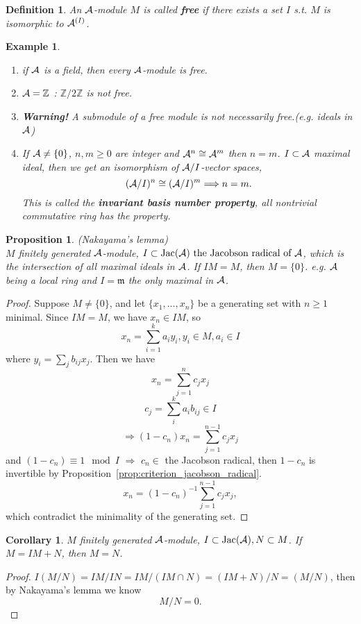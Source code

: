 \documentclass[11pt]{article}
\newtheorem{prop}[thm]{Proposition}
\newtheorem{cor}[thm]{Corollary}
\newtheorem{dfn}[thm]{Definition}
\newtheorem{ex}[thm]{Example}
\newcommand{\intg}{\mathbb Z}
\newcommand{\scm}{{\mathfrak m}}
\newcommand{\cala}{{\cal A}}
\newcommand{\Lrta}{\Longrightarrow}
\begin{document}
\begin{dfn}
An $\cala$-module $M$ is called \textbf{free} if there exists a set $I$ s.t. $M$ is isomorphic to $\cala^{(I)}$.
\end{dfn}
\begin{ex}\ 
\begin{enumerate}
\item if $\cala$ is a field, then every $\cala$-module is free.
\item $\cala=\intg$ : $\intg/2\intg$ is not free.
\item \textbf{Warning!} A submodule of a free module is not necessarily free.(e.g. ideals in $\cala$)
\item If $\cala\neq \{0\}$, $n,m\geq 0$ are integer and $\cala^n\cong \cala^m$ then $n=m$.
$I\subset \cala$ maximal ideal, then we get an isomorphism of $\cala/I$-vector spaces,
$$
(\cala/I)^n\cong(\cala/I)^m\Lrta n=m.
$$
This is called the \textbf{invariant basis number property}, all nontrivial commutative ring has the property. 
\end{enumerate}
\end{ex}

\begin{prop}\label{lem:Nakayama}
(Nakayama's lemma)\\
$M$ finitely generated $\cala$-module, $I\subset \text{Jac}(\cala) \text{  the Jacobson radical of $\cala$}$, which is the intersection of all maximal ideals in $\cala$.
If $IM=M$, then $M=\{0\}$. e.g. 
$\cala$ being a local ring and $I=\scm$ the only maximal in $\cala$.
\end{prop}

\begin{proof}
Suppose $M\neq \{0\}$, and let $\{x_1,...,x_n\}$ be a generating set with $n\geq1$ minimal.
Since $IM=M$, we have $x_n\in IM$, so
$$
x_n=\sum_{i=1}^k
a_i y_i, y_i\in M, a_i\in I
$$
where $y_i=\sum_j b_{ij }x_j$.
Then we have 
$$
x_n=\sum_{j=1}^n c_j x_j
$$
$$
c_j=\sum_i^k a_i b_{ij}\in I
$$
$$
\Lrta (1-c_n)x_n=\sum_{j=1}^{n-1}c_j x_j
$$ 
and
$(1-c_n)\equiv 1\mod I$ $\Lrta$ $c_n\in$ the Jacobson radical, then  $1-c_n$ is invertible by Proposition~\ref{prop:criterion_jacobson_radical}.
$$
x_n=(1-c_n)^{-1}\sum_{j=1}^{n-1}c_j x_j,
$$ 
which contradict the minimality of the generating set.
\end{proof}

\begin{cor}
$M$ finitely generated $\cala$-module, $I \subset \text{Jac}(\cala), N\subset M$. If $M=IM +N$, then $M=N$.
\end{cor}
\begin{proof}
$I(M/N)=IM/IN=IM/(IM\cap N)=(IM+N)/N=(M/N)$, then by Nakayama's lemma we know 
$$
M/N={0}.
$$
\end{proof}
\end{document}
